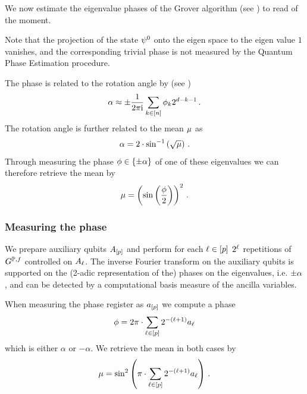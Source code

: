We now estimate the eigenvalue phases of the Grover algorithm (see ) to read of the moment.

Note that the projection of the state $\psi^{0}$ onto the eigen space to the eigen value $1$ vanishes, and the corresponding trivial phase is not measured by the Quantum Phase Estimation procedure.

The phase is related to the rotation angle by (see )
\begin{align*}
    \alpha
    \approx \pm \frac{1}{2\pi\mathrm{i}} \sum_{k\in[n]} \phi_{k} 2^{d-k-1} \, .
\end{align*}
The rotation angle is further related to the mean $\mu$ as
\begin{align*}
    \alpha = 2 \cdot \sin^{-1}\left(\sqrt{\mu}\right) \, .
\end{align*}
Through measuring the phase $\phi\in\{\pm\alpha\}$ of one of these eigenvalues we can therefore retrieve the mean by
\begin{align*}
    \mu
    = \left(\mathrm{sin}\left(\frac{\phi}{2}\right)\right)^2 \, .
\end{align*}

\subsubsection{Measuring the phase}


We prepare auxiliary qubits $A_{[p]}$ and perform for each $\ell\in[p]$ $2^{\ell}$ repetitions of $G^{\mathbb{P},f}$ controlled on $A_{\ell}$.
The inverse Fourier transform on the auxiliary qubits is supported on the (2-adic representation of the) phases on the eigenvalues, i.e. $\pm\alpha$, and can be detected by a computational basis measure of the ancilla variables.

When measuring the phase register as $a_{[p]}$ we compute a phase
\begin{align*}
    \phasecore
    =2\pi \cdot \sum_{\selindexin} 2^{-(\selindex+1)} \aindexof{\selindex} %
\end{align*}
which is either $\alpha$ or $-\alpha$.
We retrieve the mean in both cases by
\begin{align*}
    \mu
    = \sin^2\left(\pi \cdot \sum_{\ell\in[p]} 2^{-(\ell+1)} a_{\ell}\right) \, .
\end{align*}

